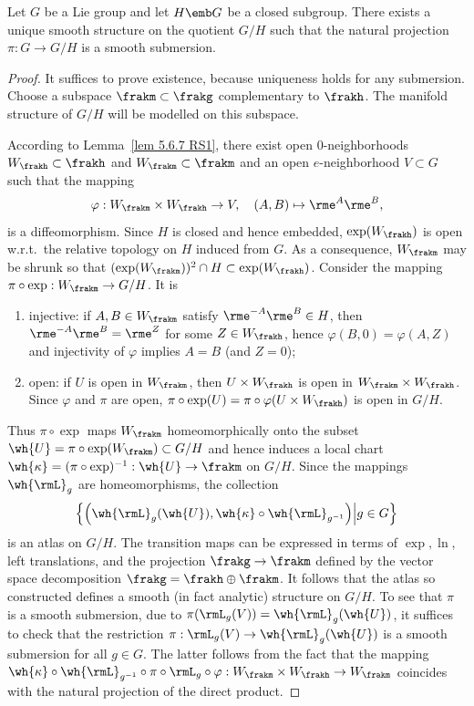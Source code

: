 \begin{thm}
    Let $G$ be a Lie group and let $H\emb G$ be a closed subgroup. There exists a unique smooth structure on the quotient $G\slash H$ such that the natural projection $\pi:G\to G\slash H$ is a smooth submersion.
\end{thm}
\begin{proof}
    It suffices to prove existence, because uniqueness holds for any submersion. Choose a subspace $\frakm\subset \frakg$ complementary to $\frakh$. The manifold structure of $G\slash H$ will be modelled on this subspace.

    According to Lemma~\ref{lem 5.6.7 RS1}, there exist open $0$-neighborhoods $W_\frakh\subset\frakh$ and $W_\frakm\subset\frakm$  and an open $e$-neighborhood $V\subset G$ such that the mapping
    \[\varphi:W_\frakm\times W_\frakh\to V,\quad (A,B)\mapsto \rme^A \rme^B,\]
    is a diffeomorphism. Since $H$ is closed and hence embedded, $\exp (W_\frakh)$ is open w.r.t.\ the relative topology on $H$ induced from $G$. As a consequence, $W_\frakm$ may be shrunk so that $(\exp(W_\frakm))^2\cap H\subset \exp(W_\frakh)$. Consider the mapping $\pi\circ \exp:W_\frakm\to G\slash H$. It is
    \begin{enumerate}[label=(\alph*)]
        \item injective: if $A,B\in W_\frakm$ satisfy $\rme^{-A}\rme^B\in H$, then $\rme^{-A}\rme^B=\rme^Z$ for some $Z\in W_\frakh$, hence $\varphi(B,0)=\varphi(A,Z)$ and injectivity of $\varphi$ implies $A=B$ (and $Z=0$);
        \item open: if $U$ is open in $W_\frakm$, then $U\times W_\frakh$ is open in $W_\frakm\times W_\frakh$. Since $\varphi$ and $\pi$ are open, $\pi\circ\exp(U)=\pi\circ\varphi(U\times W_\frakh)$ is open in $G\slash H$.
    \end{enumerate}
    Thus $\pi\circ\exp$ maps $W_\frakm$ homeomorphically onto the subset $\wh{U}=\pi\circ\exp(W_\frakm)\subset G\slash H$ and hence induces a local chart $\wh{\kappa}=(\pi\circ\exp)^{-1}:\wh{U}\to \frakm$ on $G\slash H$. Since the mappings $\wh{\rmL}_g$ are homeomorphisms, the collection
    \[\left\{\left(\wh{\rmL}_g(\wh{U}),\wh{\kappa}\circ \wh{\rmL}_{g^{-1}}\right)\middle| g\in G\right\}\]
    is an atlas on $G\slash H$. The transition maps can be expressed in terms of $\exp,\ln$, left translations, and the projection $\frakg\to\frakm$ defined by the vector space decomposition $\frakg=\frakh\oplus\frakm$. It follows that the atlas so constructed defines a smooth (in fact analytic) structure on $G\slash H$. To see that $\pi$ is a smooth submersion, due to $\pi(\rmL_g(V))=\wh{\rmL}_g(\wh{U})$, it suffices to check that the restriction $\pi:\rmL_g(V)\to \wh{\rmL}_g(\wh{U})$ is a smooth submersion for all $g\in G$. The latter follows from the fact that the mapping $\wh{\kappa}\circ\wh{\rmL}_{g^{-1}}\circ\pi\circ \rmL_g\circ\varphi:W_\frakm\times W_\frakh\to W_\frakm$ coincides with the natural projection of the direct product.
\end{proof}



